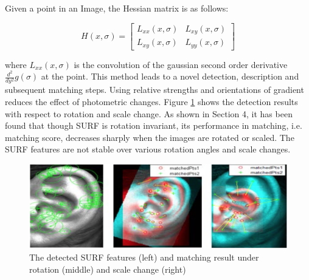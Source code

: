 Given a point in an Image, the Hessian matrix is as follows:

\[
H(x,\sigma) =  
	\begin{bmatrix}
		L_{xx}(x,\sigma) &  L_{xy}(x,\sigma)\\
		L_{xy}(x,\sigma) &  L_{yy}(x,\sigma)
	\end{bmatrix}
\]

where $L_{xx}(x,\sigma)$ is the convolution of the gaussian second order derivative 
$\frac{d^2}{dy^2}g(\sigma)$ at the point. This method leads to a novel detection, description and subsequent matching steps. Using relative strengths and orientations of gradient reduces the effect of photometric changes. Figure \ref{fig:Figure9} shows the detection results with respect to rotation and scale change. As shown in Section 4, it has been found that though SURF is rotation invariant, its performance in matching, i.e. matching score, decreases sharply when the images are rotated or scaled. The SURF features are not stable over various rotation angles and scale changes.
\\ 
\begin{figure}
	\includegraphics[width=\textwidth]{Figures/Figure9}
	\caption{The detected SURF features (left) and matching result under rotation (middle) and scale change (right)}
	\label{fig:Figure9}
\end{figure}

